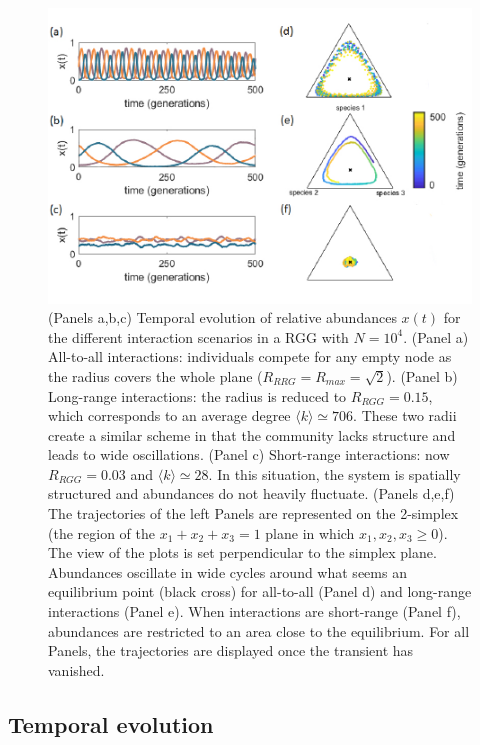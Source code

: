 \begin{figure}[t!]
     \centering
\includegraphics[width=1.1\textwidth]{figures/chp1/fig3.pdf}
 \caption[Temporal evolution of relative abundances and simplex representation]{(Panels a,b,c) Temporal evolution of relative abundances $x(t)$ for the different interaction scenarios in a RGG with $ N = 10^4$. (Panel a) All-to-all interactions: individuals compete for any empty node as the radius covers the whole plane ($R_{RRG} = R_{max} = \sqrt{2}$). (Panel b) Long-range interactions: the radius is reduced to $R_{RGG} = 0.15$, which corresponds to an average degree $\langle k \rangle \simeq 706$. These two radii create a similar scheme in that the community lacks structure and leads to wide oscillations. (Panel c) Short-range interactions: now $R_{RGG} = 0.03$ and $\langle k \rangle \simeq 28$. In this situation, the system is spatially structured and abundances do not heavily fluctuate. (Panels d,e,f) The trajectories of the left Panels are represented on the 2-simplex (the region of the $x_1 + x_2+ x_3 = 1$ plane in which $x_1,x_2,x_3 \geq 0$). The view of the plots is set perpendicular to the simplex plane. Abundances oscillate in wide cycles around what seems an equilibrium point (black cross) for all-to-all (Panel d) and long-range interactions (Panel e). When interactions are short-range (Panel f), abundances are restricted to an area close to the equilibrium. For all Panels, the trajectories are displayed once the transient has vanished.}
\label{chp1:fig:3}
\end{figure}
\subsection{\label{chp1:2.1}Temporal evolution}

